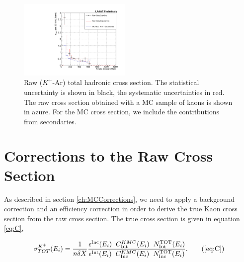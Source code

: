 \begin{figure}
\centering  
\includegraphics[width=0.48\textwidth]{Chapter-7/Images/Plots_MCData_XS_StatSystK_WithDK.pdf}
\caption{Raw ($K^+$-Ar) total hadronic cross section. The statistical uncertainty is shown in black, the systematic uncertainties in red. The raw cross section obtained with a MC sample of kaons is shown in azure. For the MC cross section,  we include the contributions from secondaries. }
\label{fig:XSRawK}
\end{figure}


\section{Corrections to the Raw Cross Section}\label{ch:KaonXSCorrections}
As described in section \ref{ch:MCCorrections}, we need to apply a background correction and an efficiency correction in order to derive the true Kaon cross section from the raw cross section.  The true cross section is given in equation \ref{eq:C}, 

\begin{equation}
   \sigma^{K^+}_{TOT}(E_{i})  = \frac{1}{n \delta X}\frac{ \epsilon^{\text{Inc}}(E_i)  \hspace{0.2cm} C^{K MC}_{\text{Int}} (E_{i}) \hspace{0.2cm} N^{\text{TOT}}_{\text{Int}} (E_{i}) }{   \epsilon^{\text{Int}}(E_i) \hspace{0.2cm} C^{K MC}_{\text{Inc}} (E_{i}) \hspace{0.2cm}  N^{\text{TOT}}_{\text{Inc}} (E_{i})}.
 \tag{\ref{eq:C}}
\end{equation}

